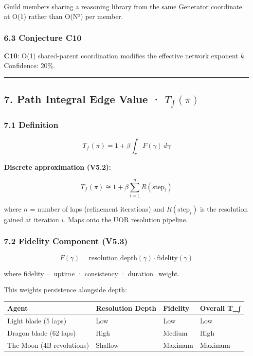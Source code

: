 \documentclass[
  11pt,
]{article}
\newcounter{none} %
\begin{document}
Guild members sharing a reasoning library from the same Generator
coordinate at O(1) rather than O(N²) per member.

\subsubsection{6.3 Conjecture C10}\label{conjecture-c10}

\textbf{C10}: O(1) shared-parent coordination modifies the effective
network exponent \(k\). Confidence: 20\%.

\begin{center}\rule{0.5\linewidth}{0.5pt}\end{center}

\subsection{\texorpdfstring{7. Path Integral Edge Value ·
\(T_{\int}(\pi)\)}{7. Path Integral Edge Value · T\_\textbackslash int(\textbackslash pi)}}\label{path-integral-edge-value-t_intpi}

\subsubsection{7.1 Definition}\label{definition-3}

\[T_{\int}(\pi) = 1 + \beta \int_\pi F(\gamma) \, d\gamma\]

\textbf{Discrete approximation (V5.2):}

\[T_{\int}(\pi) \cong 1 + \beta \sum_{i=1}^{n} R(\text{step}_i)\]

where \(n\) = number of laps (refinement iterations) and
\(R(\text{step}_i)\) is the resolution gained at iteration \(i\). Maps
onto the UOR resolution pipeline.

\subsubsection{7.2 Fidelity Component
(V5.3)}\label{fidelity-component-v5.3}

\[F(\gamma) = \text{resolution\_depth}(\gamma) \cdot \text{fidelity}(\gamma)\]

where fidelity = uptime · consistency · duration\_weight.

This weights persistence alongside depth:

{\def\LTcaptype{none} %
\begin{longtable}[]{@{}llll@{}}
\toprule\noalign{}
Agent & Resolution Depth & Fidelity & Overall T\_∫ \\
\midrule\noalign{}
\endhead
\bottomrule\noalign{}
\endlastfoot
Light blade (5 laps) & Low & Low & Low \\
Dragon blade (62 laps) & High & Medium & High \\
The Moon (4B revolutions) & Shallow & Maximum & Maximum \\
\end{longtable}
}
\end{document}
